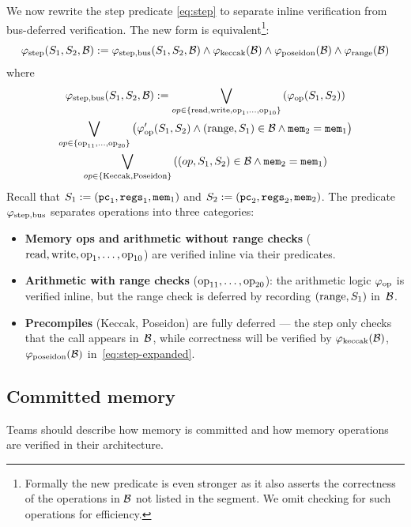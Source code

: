 We now rewrite the step predicate \eqref{eq:step} to separate
inline verification from bus-deferred verification.
The new form is equivalent\footnote{Formally the new predicate is even stronger
as it also asserts the correctness of the operations in $\mathcal{B}$ not listed
in the segment.
 We omit checking for such operations for efficiency.}:
\begin{equation}\label{eq:step-expanded}
  \varphi_{\mathrm{step}}(S_1,S_2,\mathcal{B}):=
\varphi_{\mathrm{step,bus}}(S_1,S_2,\mathcal{B})
\wedge \varphi_{\mathrm{\mathrm{keccak}}}(\mathcal{B})\wedge \varphi_{\mathrm{\mathrm{poseidon}}}(\mathcal{B}) \wedge \varphi_{\mathrm{\mathrm{range}}}(\mathcal{B})
\end{equation}
where
\begin{multline}
	\varphi_{\mathrm{step,bus}}(S_1,S_2,\mathcal{B}):=
\bigvee_{op\in \{\mathrm{read},\mathrm{write},\mathrm{op}_1, \ldots,\mathrm{op}_{10}\}}
\left(\varphi_{\mathrm{op}}(S_1,S_2)
\right)\\
\bigvee_{op\in \{\mathrm{op}_{11}, \ldots,\mathrm{op}_{20}\}}
 \left(\varphi_{\mathrm{op}}'(S_1,S_2)
\wedge (\mathrm{range},S_1)\in\mathcal{B} \wedge \mathtt{mem}_2=\mathtt{mem}_1\right)\\
\bigvee_{op\in \{\text{Keccak},\text{Poseidon}\}} \left((op,S_1,S_2)\in\mathcal{B} \wedge \mathtt{mem}_2=\mathtt{mem}_1\right)
\end{multline}
Recall that $S_1:=(\mathtt{pc}_1,\mathtt{regs}_1,\mathtt{mem}_1)$ and $S_2:=(\mathtt{pc}_2,\mathtt{regs}_2,\mathtt{mem}_2)$.
The predicate $\varphi_{\mathrm{step,bus}}$ separates operations into three categories:
\begin{itemize}
\item \textbf{Memory ops and arithmetic without range checks} ($\mathrm{read},\mathrm{write},\mathrm{op}_1,\ldots,\mathrm{op}_{10}$) are verified inline via their predicates.
\item \textbf{Arithmetic with range checks} ($\mathrm{op}_{11},\ldots,\mathrm{op}_{20}$): the arithmetic logic $\varphi_{\mathrm{op}}$ is verified inline, but the range check is deferred by recording $(\mathrm{range},S_1)$ in~$\mathcal{B}$.
\item \textbf{Precompiles} (Keccak, Poseidon) are fully deferred --- the step only checks that the call appears in~$\mathcal{B}$, while correctness will be verified by $\varphi_{\mathrm{\mathrm{keccak}}}(\mathcal{B})$, $\varphi_{\mathrm{\mathrm{poseidon}}}(\mathcal{B})$ in~\eqref{eq:step-expanded}.
\end{itemize}


\subsection{Committed memory}

\begin{instruction}
Teams should describe how memory is committed
and how memory operations are verified in their architecture.
\end{instruction}

